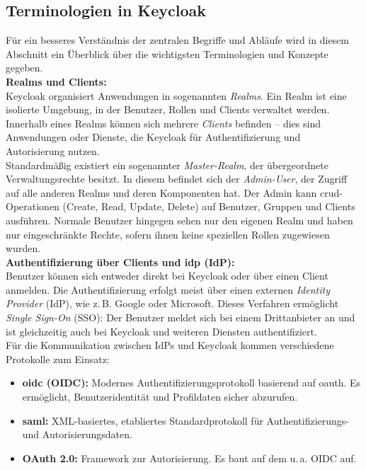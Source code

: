 \documentclass[a4paper,12pt]{article}
\begin{document}
	\subsection{Terminologien in Keycloak}
	Für ein besseres Verständnis der zentralen Begriffe und Abläufe wird in diesem Abschnitt ein Überblick über die wichtigsten Terminologien und Konzepte gegeben.
	\\[0.5em]
	\textbf{Realms und Clients:}\\
	Keycloak organisiert Anwendungen in sogenannten \textit{Realms}. Ein Realm ist eine isolierte Umgebung, in der Benutzer, Rollen und Clients verwaltet werden. Innerhalb eines Realms können sich mehrere \textit{Clients} befinden – dies sind Anwendungen oder Dienste, die Keycloak für Authentifizierung und Autorisierung nutzen.
	\\[0.5em]
	Standardmäßig existiert ein sogenannter \textit{Master-Realm}, der übergeordnete Verwaltungsrechte besitzt. In diesem befindet sich der \textit{Admin-User}, der Zugriff auf alle anderen Realms und deren Komponenten hat. Der Admin kann \gls{crud}-Operationen (Create, Read, Update, Delete) auf Benutzer, Gruppen und Clients ausführen. Normale Benutzer hingegen sehen nur den eigenen Realm und haben nur eingeschränkte Rechte, sofern ihnen keine speziellen Rollen zugewiesen wurden.
	\\[0.5em]
	\textbf{Authentifizierung über Clients und \gls{idp} (IdP):}\\
	Benutzer können sich entweder direkt bei Keycloak oder über einen Client anmelden. Die Authentifizierung erfolgt meist über einen externen \textit{Identity Provider} (IdP), wie z.\,B. Google oder Microsoft. Dieses Verfahren ermöglicht \textit{Single Sign-On} (SSO): Der Benutzer meldet sich bei einem Drittanbieter an und ist gleichzeitig auch bei Keycloak und weiteren Diensten authentifiziert.
	\\[0.5em]
	Für die Kommunikation zwischen IdPs und Keycloak kommen verschiedene Protokolle zum Einsatz:
	\begin{itemize}
		\item \textbf{\gls{oidc} (OIDC):} Modernes Authentifizierungsprotokoll basierend auf \gls{oauth}. Es ermöglicht, Benutzeridentität und Profildaten sicher abzurufen.
		\item \textbf{\gls{saml}:} XML-basiertes, etabliertes Standardprotokoll für Authentifizierungs- und Autorisierungsdaten.
		\item \textbf{OAuth 2.0:} Framework zur Autorisierung. Es baut auf dem u.\,a. OIDC auf.
	\end{itemize}
	
\end{document}

